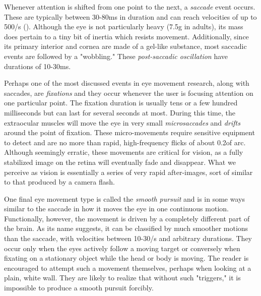 Whenever attention is shifted from one point to the next, a \textit{saccade} event occurs. These are typically between 30-80ms in duration and can reach velocities of up to 500\degree/s (\cite{holmqvist2011}). Although the eye is not particularly heavy (7.5g in adults), its mass does pertain to a tiny bit of inertia which resists movement. Additionally, since its primary interior and cornea are made of a gel-like substance, most saccadic events are followed by a "wobbling." These \textit{post-saccadic oscillation} have durations of 10-30ms.


Perhaps one of the most discussed events in eye movement research, along with saccades, are \textit{fixations} and they occur whenever the user is focusing attention on one particular point. The fixation duration is usually tens or a few hundred milliseconds but can last for several seconds at most. During this time, the extraocular muscles will move the eye in very small \textit{microsaccades} and \textit{drifts} around the point of fixation. These micro-movements require sensitive equipment to detect and are no more than rapid, high-frequency flicks of about 0.2\degree of arc. Although seemingly erratic, these movements are critical for vision, as a fully stabilized image on the retina will eventually fade and disappear. What we perceive as vision is essentially a series of very rapid after-images, sort of similar to that produced by a camera flash.

One final eye movement type is called the \textit{smooth pursuit} and is in some ways similar to the saccade in how it moves the eye in one continuous motion. Functionally, however, the movement is driven by a completely different part of the brain. As its name suggests, it can be classified by much smoother motions than the saccade, with velocities between 10-30\degree/s and arbitrary durations. They occur only when the eyes actively follow a moving target or conversely when fixating on a stationary object while the head or body is moving. The reader is encouraged to attempt such a movement themselves, perhaps when looking at a plain, white wall. They are likely to realize that without such "triggers," it is impossible to produce a smooth pursuit forcibly.









